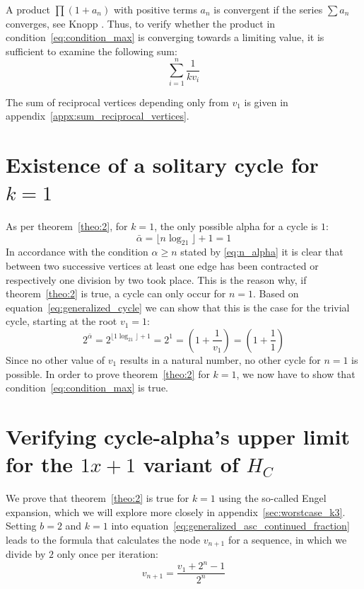 A product $\prod(1+a_n)$ with positive terms $a_n$ is convergent if the series $\sum a_n$ converges, see Knopp \cite[p.~220]{Ref_Knopp}. Thus, to verify whether the product in condition~\ref{eq:condition_max} is converging towards a limiting value, it is sufficient to examine the following sum:
\begin{equation*}
\sum_{i=1}^{n}\frac{1}{kv_{i}}
\end{equation*}

The sum of reciprocal vertices depending only from $v_1$ is given in appendix~\ref{appx:sum_reciprocal_vertices}.

\section{Existence of a solitary cycle for $k=1$}
As per theorem~\ref{theo:2}, for $k=1$, the only possible alpha for a cycle is $1$:
\[
\bar\alpha=\lfloor n\log_21\rfloor+1=1
\]
In accordance with the condition $\alpha\ge n$ stated by \ref{eq:n_alpha} it is clear that between two successive vertices at least one edge has been contracted or respectively one division by two took place. This is the reason why, if theorem~\ref{theo:2} is true, a cycle can only occur for $n=1$. Based on equation~\ref{eq:generalized_cycle} we can show that this is the case for the trivial cycle, starting at the root $v_1=1$:
\[
2^{\bar\alpha}=2^{\lfloor 1\log_21\rfloor+1}=2^1=\left(1+\frac{1}{v_1}\right)=\left(1+\frac{1}{1}\right)
\]
Since no other value of $v_1$ results in a natural number, no other cycle for $n=1$ is possible. In order to prove theorem~\ref{theo:2} for $k=1$, we now have to show that condition~\ref{eq:condition_max} is true.

\section{Verifying cycle-alpha's upper limit for the $1x+1$ variant of $H_C$}
\label{sec:alphas_upper_limit_k_1}
We prove that theorem~\ref{theo:2} is true for $k=1$ using the so-called Engel expansion, which we will explore more closely in appendix~\ref{sec:worstcase_k3}. Setting $b=2$ and $k=1$ into equation~\ref{eq:generalized_asc_continued_fraction} leads to the formula that calculates the node $v_{n+1}$ for a sequence, in which we divide by $2$ only once per iteration:
\begin{equation}
\label{eq:appx_1}
v_{n+1}=\frac{v_1+2^n-1}{2^n}
\end{equation}

